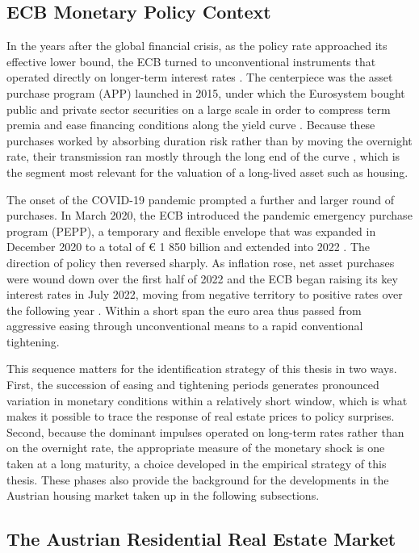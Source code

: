 \documentclass[a4paper,12pt, headsepline]{scrartcl}
\numberwithin{equation}{section}
\begin{document}
\subsection{ECB Monetary Policy Context}\label{subsec:ecb-context}

In the years after the global financial crisis, as the policy rate approached its effective lower bound, the ECB turned to unconventional instruments that operated directly on longer-term interest rates \citep{benigno2023}. The centerpiece was the asset purchase program (APP) launched in 2015, under which the Eurosystem bought public and private sector securities on a large scale in order to compress term premia and ease financing conditions along the yield curve \citep{ecb_app}. Because these purchases worked by absorbing duration risk rather than by moving the overnight rate, their transmission ran mostly through the long end of the curve \citep{eser2019}, which is the segment most relevant for the valuation of a long-lived asset such as housing.

The onset of the COVID-19 pandemic prompted a further and larger round of purchases. In March 2020, the ECB introduced the pandemic emergency purchase program (PEPP), a temporary and flexible envelope that was expanded in December 2020 to a total of € 1 850 billion and extended into 2022 \citep{ecb_pepp, ecb_press2020}. The direction of policy then reversed sharply. As inflation rose, net asset purchases were wound down over the first half of 2022 and the ECB began raising its key interest rates in July 2022, moving from negative territory to positive rates over the following year \citep{ecb_press2022}. Within a short span the euro area thus passed from aggressive easing through unconventional means to a rapid conventional tightening.

This sequence matters for the identification strategy of this thesis in two ways. First, the succession of easing and tightening periods generates pronounced variation in monetary conditions within a relatively short window, which is what makes it possible to trace the response of real estate prices to policy surprises. Second, because the dominant impulses operated on long-term rates rather than on the overnight rate, the appropriate measure of the monetary shock is one taken at a long maturity, a choice developed in the empirical strategy of this thesis. These phases also provide the background for the developments in the Austrian housing market taken up in the following subsections.

\subsection{The Austrian Residential Real Estate Market}\label{subsec:at-market}
\end{document}

